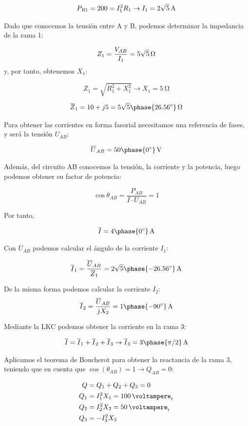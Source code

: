 \[
  P_{R1} = 200 = I_1^2 R_1 \rightarrow I_1 = \qty[parse-numbers=false]{2\sqrt{5}}{\ampere}
\]

Dado que conocemos la tensión entre A y B, podemos determinar la impedancia de la rama 1:

\[
  Z_1 = \frac{V_{AB}}{I_1} = \qty[parse-numbers=false]{5\sqrt{5}}{\ohm}
\]
y, por tanto, obtenemos $X_1$:

\[
  Z_1 = \sqrt{R_1^2 + X_1^2} \rightarrow X_1 = \qty{5}{\ohm}
\]

\[
  \overline{Z}_1 = 10 + j5 = \qty[parse-numbers=false]{5\sqrt{5}\phase{\ang{26.56}}}{\ohm} 
\]

Para obtener las corrientes en forma fasorial necesitamos una referencia de fases, y será la tensión $U_{AB}$:

\[
  \overline{U}_{AB} = \qty[parse-numbers=false]{50\phase{\ang{0}}}{\volt}
\]

Además, del circuito AB conocemos la tensión, la corriente y la potencia, luego podemos obtener su factor de potencia:

\[
  \cos\theta_{AB} = \frac{P_{AB}}{I \cdot U_{AB}} = 1
\]

Por tanto,

\[
  \overline{I} = \qty[parse-numbers=false]{4\phase{\ang{0}}}{\ampere}
\]


Con $\overline{U}_{AB}$ podemos calcular el ángulo de la corriente $I_1$:

\[
  \overline{I}_1 = \frac{\overline{U}_{AB}}{\overline{Z}_1} = \qty[parse-numbers=false]{2\sqrt{5}\phase{\ang{-26.56}}}{\ampere} 
\]

De la misma forma podemos calcular la corriente $I_2$:
\[
  \overline{I}_2 = \frac{\overline{U}_{AB}}{jX_2} = \qty[parse-numbers=false]{1\phase{\ang{-90}}}{\ampere} 
\]
  
Mediante la LKC podemos obtener la corriente en la rama 3:

\[
  \overline{I} = \overline{I}_1 + \overline{I}_2 + \overline{I}_3 \rightarrow \overline{I}_3 = \qty[parse-numbers=false]{3\phase{\pi/2}}{\ampere}
\]

Aplicamos el teorema de Boucherot para obtener la reactancia de la rama 3, teniendo que en cuenta que $\cos(\theta_{AB}) = 1 \rightarrow Q_{AB} = 0$:

\begin{align*}
  Q &= Q_1 + Q_2 + Q_3 = 0\\
  Q_1 &= I_1^2 X_1 = \qty{100}{\voltampere_r}\\
  Q_2 &= I_2^2 X_2 = \qty{50}{\voltampere_r}\\
  Q_3 &= - I_3^2 X_3
\end{align*}

